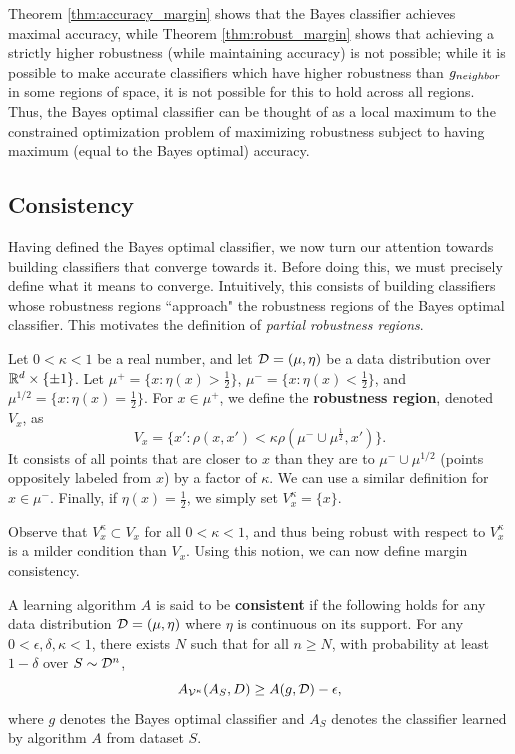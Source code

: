 Theorem \ref{thm:accuracy_margin} shows that the \natural\emph{ }Bayes classifier achieves maximal accuracy, while Theorem \ref{thm:robust_margin} shows that achieving a strictly higher robustness (while maintaining accuracy) is not possible; while it is possible to make accurate classifiers which have higher robustness than $g_{neighbor}$ in some regions of space, it is not possible for this to hold across all regions. Thus, the \natural\emph{ }Bayes optimal classifier can be thought of as a local maximum to the constrained optimization problem of maximizing robustness subject to having maximum (equal to the Bayes optimal) accuracy.

\subsection{\Ncons\emph{ }Consistency}

Having defined the \natural\emph{ }Bayes optimal classifier, we now turn our attention towards building classifiers that converge towards it. Before doing this, we must precisely define what it means to converge. Intuitively, this consists of building classifiers whose robustness regions ``approach" the robustness regions of the \natural\emph{ }Bayes optimal classifier. This motivates the definition of \textit{partial \natural\emph{ }robustness regions}.
\begin{defn}\label{def:partial_nat_region}
Let $0 < \kappa < 1$ be a real number, and let ${\mathcal D} = (\mu, \eta)$ be a data distribution over $\mathbb R^d \times \{\pm 1\}$. Let $\mu^+ = \{x: \eta(x) > \frac{1}{2}\}$, $\mu^- = \{x: \eta(x) < \frac{1}{2}\}$, and $\mu^{1/2} = \{x: \eta(x) = \frac{1}{2}\}$. For $x \in \mu^+$, we define the \textbf{\natural\emph{ }robustness region}, denoted $V_x$, as $$V_x = \{x': \rho(x, x') < \kappa\rho(\mu^- \cup \mu^{\frac{1}{2}}, x')\}.$$ It consists of all points that are closer to $x$ than they are to $\mu^- \cup \mu^{1/2}$ (points oppositely labeled from $x$) by a factor of $\kappa$. We can use a similar definition for $x \in \mu^{-}$. Finally, if $\eta(x) = \frac{1}{2}$, we simply set $V_x^\kappa = \{x\}$.
\end{defn}

Observe that $V_x^{\kappa} \subset V_x$ for all $0 < \kappa < 1$, and thus being robust with respect to $V_x^{\kappa}$ is a milder condition than $V_x$. Using this notion, we can now define margin consistency.

\begin{defn}\label{definition:neighborhood_consistent}
A learning algorithm $A$ is said to be \textbf{\ncons\emph{ }consistent} if the following holds for any data distribution ${\mathcal D} = (\mu, \eta)$ where $\eta$ is continuous on its support. For any $0 < \epsilon, \delta, \kappa < 1$, there exists $N$ such that for all $n \geq N$, with probability at least $1- \delta$ over $S \sim {\mathcal D}^n$, $$A_{{\mathcal V}^\kappa}(A_S, D) \geq A(g, {\mathcal D}) - \epsilon,$$  where $g$ denotes the Bayes optimal classifier and $A_S$ denotes the classifier learned by algorithm $A$ from dataset $S$. 
\end{defn}

